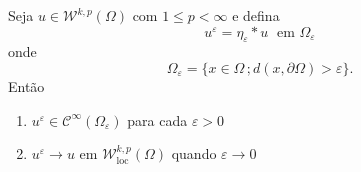\documentclass[a4paper, 11pt]{book}
\theoremstyle{definition}
\newcommand{\cC}{\mathcal{C}}
\newcommand{\cW}{\mathcal{W}}
\begin{document}
\begin{tbox}
    Seja $u \in \cW^{k,p}(\Omega)$ com $1 \leqslant p < \infty$ e defina
    \[
        u^{\varepsilon} = \eta_{\varepsilon} * u \;\text{ em } \Omega_\varepsilon
    \]
    onde
    \[
        \Omega_\varepsilon = \{ x \in \Omega \,; d(x,\partial\Omega) > \varepsilon\}.
    \]
    Então
    \begin{enumerate}[leftmargin=*, label=\textbf{(\alph*)}]
        \item $u^\varepsilon \in \cC^{\infty}(\Omega_\varepsilon)$ para cada $\varepsilon > 0$
        \item $u^\varepsilon \to u$ em $\cW^{k,p}_{\mathrm{loc}}(\Omega)$ quando $\varepsilon \to 0$
    \end{enumerate}
\end{tbox}
\end{document}
